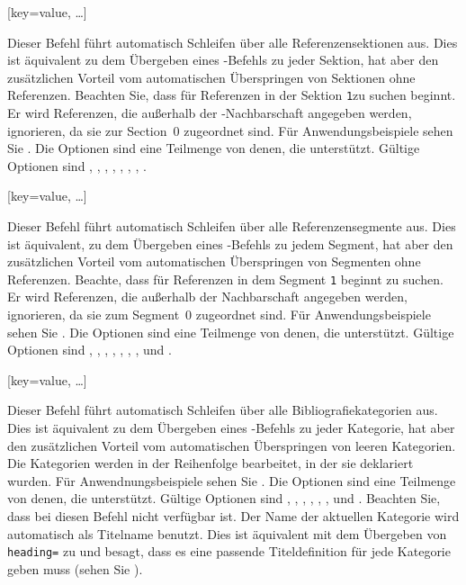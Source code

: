 \documentclass{ltxdockit}[2011/03/25]
\begin{document}
\begin{ltxsyntax}

[key=value, \dots]

Dieser Befehl führt automatisch Schleifen über alle Referenzensektionen aus.
Dies ist äquivalent zu dem Übergeben eines -Befehls zu
jeder Sektion, hat aber den zusätzlichen Vorteil vom automatischen Überspringen
von Sektionen ohne Referenzen. Beachten Sie, dass  für
Referenzen in der Sektion \texttt{1}zu suchen  beginnt. Er wird Referenzen, die
außerhalb der -Nachbarschaft angegeben werden, ignorieren, da
sie zur Section~0 zugeordnet sind. Für Anwendungsbeispiele sehen Sie
. Die Optionen sind eine Teilmenge von denen, die
 unterstützt. Gültige Optionen sind ,
, , , , ,
, .   

[key=value, \dots]

Dieser Befehl führt automatisch Schleifen über alle Referenzensegmente aus.
Dies ist äquivalent, zu dem Übergeben eines -Befehls zu
jedem Segment, hat aber den zusätzlichen Vorteil vom automatischen Überspringen
von Segmenten ohne Referenzen. Beachte, dass  für
Referenzen in dem Segment \texttt{1} beginnt zu suchen. Er wird Referenzen, die
außerhalb der   Nachbarschaft angegeben werden, ignorieren, da
sie zum Segment~0 zugeordnet sind. Für Anwendungsbeispiele sehen Sie
. Die Optionen sind eine Teilmenge von denen, die
 unterstützt. Gültige Optionen sind ,
, , , , ,
,  und . 

[key=value, \dots]

Dieser Befehl führt automatisch Schleifen über alle Bibliografiekategorien
aus. Dies ist äquivalent zu dem Übergeben eines -Befehls
zu jeder Kategorie, hat aber den zusätzlichen Vorteil vom automatischen
Überspringen von leeren Kategorien. Die Kategorien werden in der Reihenfolge
bearbeitet, in der sie deklariert wurden. Für Anwendnungsbeispiele sehen Sie
. Die Optionen sind eine Teilmenge von denen, die
 unterstützt. Gültige Optionen sind ,
, , , , ,
 und . Beachten Sie, dass  bei diesen Befehl
nicht verfügbar ist. Der Name der aktuellen Kategorie wird automatisch als
Titelname benutzt. Dies ist äquivalent mit dem Übergeben von
\texttt{heading=} zu  und besagt, dass es
eine passende Titeldefinition für jede Kategorie geben muss (sehen Sie
).   


\end{ltxsyntax}
\end{document}
